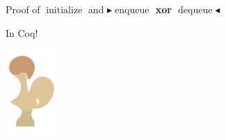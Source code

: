 \documentclass[9pt]{beamer}
\newcommand{\initialise}{\operatorname{initialize}}
\newcommand{\enqueue}{\operatorname{enqueue}}
\newcommand{\dequeue}{\operatorname{dequeue}}
\newcommand{\todo}[1]{{\color[rgb]{.5,0,0}\textbf{$\blacktriangleright$#1$\blacktriangleleft$}}}
\begin{document}
\begin{frame}{Proof of $\initialise$ and \todo{$\enqueue$ xor $\dequeue$}}
  \begin{center}
    {\fontsize{40}{60}\selectfont In Coq!}\\
  \end{center}
  \begin{center}
    \includegraphics[width=0.15\textwidth]{coq-logo-large.png}
  \end{center}
\end{frame}

\end{document}
